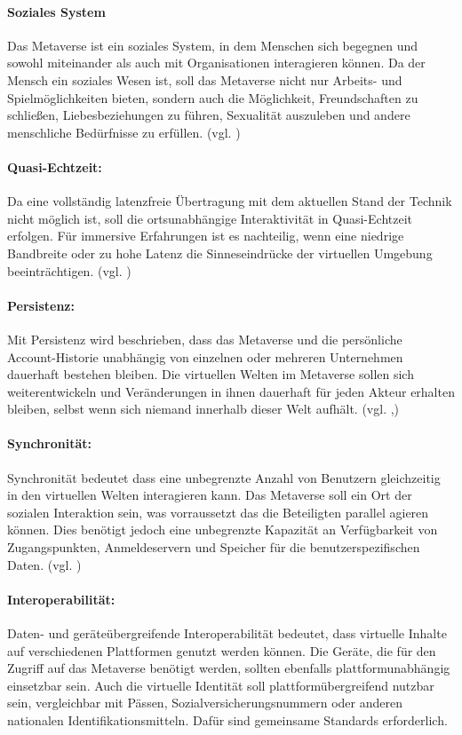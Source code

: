 \paragraph{Soziales System} Das Metaverse ist ein soziales System, in dem Menschen sich begegnen und sowohl miteinander als auch mit Organisationen interagieren können. Da der Mensch ein soziales Wesen ist, soll das Metaverse nicht nur Arbeits- und Spielmöglichkeiten bieten, sondern auch die Möglichkeit, Freundschaften zu schließen, Liebesbeziehungen zu führen, Sexualität auszuleben und andere menschliche Bedürfnisse zu erfüllen. (vgl. \cite{MVkompaktCharak})

\paragraph{Quasi-Echtzeit:} Da eine vollständig latenzfreie Übertragung mit dem aktuellen Stand der Technik nicht möglich ist, soll die ortsunabhängige Interaktivität in Quasi-Echtzeit erfolgen. Für immersive Erfahrungen ist es nachteilig, wenn eine niedrige Bandbreite oder zu hohe Latenz die Sinneseindrücke der virtuellen Umgebung beeinträchtigen. (vgl. \cite{Ball22charak})

\paragraph{Persistenz:} Mit Persistenz wird beschrieben, dass das Metaverse und die persönliche Account-Historie unabhängig von einzelnen oder mehreren Unternehmen dauerhaft bestehen bleiben. Die virtuellen Welten im Metaverse sollen sich weiterentwickeln und Veränderungen in ihnen dauerhaft für jeden Akteur erhalten bleiben, selbst wenn sich niemand innerhalb dieser Welt aufhält. (vgl. \cite{persist},\cite{MVkompaktCharak}) 

\paragraph{Synchronität:} Synchronität bedeutet dass eine unbegrenzte Anzahl von Benutzern gleichzeitig in den virtuellen Welten interagieren kann. Das Metaverse soll ein Ort der sozialen Interaktion sein, was vorraussetzt das die Beteiligten parallel agieren können. Dies benötigt jedoch eine unbegrenzte Kapazität an Verfügbarkeit von Zugangspunkten, Anmeldeservern und Speicher für die benutzerspezifischen Daten. (vgl. \cite{BVDWDef}) 

\paragraph{Interoperabilität:} Daten- und geräteübergreifende Interoperabilität bedeutet, dass virtuelle Inhalte auf verschiedenen Plattformen genutzt werden können. Die Geräte, die für den Zugriff auf das Metaverse benötigt werden, sollten ebenfalls plattformunabhängig einsetzbar sein. Auch die virtuelle Identität soll plattformübergreifend nutzbar sein, vergleichbar mit Pässen, Sozialversicherungsnummern oder anderen nationalen Identifikationsmitteln. Dafür sind gemeinsame Standards erforderlich.

